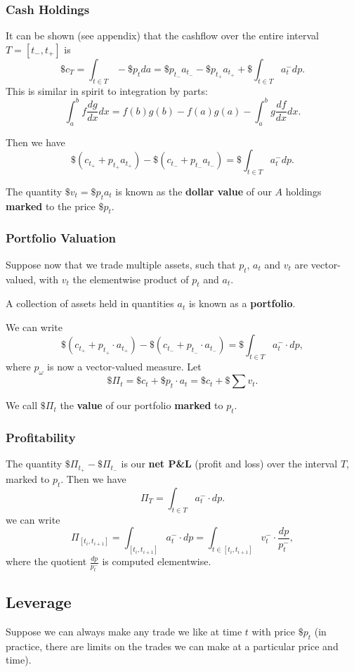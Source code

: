 \documentclass{article}
\begin{document}
\subsubsection{Cash Holdings}
It can be shown (see appendix) that the cashflow over the entire interval $T=[t_-,t_+]$ is
$$\$c_T = \int_{t\in T} - \$p_t da = \$p_{t_-}a_{t_-} - \$p_{t_+}a_{t_+} + \$\int_{t\in T} a_t^- dp.$$
This is similar in spirit to integration by parts:
$$\int_a^b f \frac{dg}{dx} dx = f(b)g(b)-f(a)g(a) - \int_a^b g \frac{df}{dx} dx.$$

Then we have
$$\$(c_{t_+} + p_{t_+}a_{t_+}) - \$(c_{t_-} + p_{t_-}a_{t_-}) = \$\int_{t\in T} a_t^- dp.$$

The quantity $\$v_t = \$p_t a_t$ is known as the \textbf{dollar value} of our $A$ holdings \textbf{marked} to the price $\$p_t$.%

\subsubsection{Portfolio Valuation}
Suppose now that we trade multiple assets, such that $p_t$, $a_t$ and $v_t$ are vector-valued, with $v_t$ the elementwise product of $p_t$ and $a_t$.

A collection of assets held in quantities $a_t$ is known as a \textbf{portfolio}.

We can write
$$\$(c_{t_+} + p_{t_+} \cdot a_{t_+}) - \$(c_{t_-} + p_{t_-} \cdot a_{t_-}) = \$\int_{t\in T} a_t^- \cdot dp,$$
where $p_\omega$ is now a vector-valued measure. Let
$$\$\Pi_t = \$c_t + \$p_t\cdot a_t = \$c_t + \$\sum v_t.$$

We call $\$\Pi_t$ the \textbf{value} of our portfolio \textbf{marked} to $p_t$.

\subsubsection{Profitability}
The quantity $\$\Pi_{t_+} - \$\Pi_{t_-}$ is our \textbf{net P\&L} (profit and loss) over the interval $T$, marked to $p_t$.
Then we have
$$\Pi_T	= \int_{t\in T} a_t^- \cdot dp.$$
we can write
$$\Pi_{[t_i,t_{i+1}]} = \int_{[t_i,t_{i+1}]} a_t^- \cdot dp = \int_{t\in [t_i, t_{i+1}]} v_t^- \cdot \frac{dp}{p_t^-},$$
where the quotient $\frac{dp}{p_t^-}$ is computed elementwise.

\subsection{Leverage}
Suppose we can always make any trade we like at time $t$ with price $\$p_t$ (in practice, there are limits on the trades we can make at a particular price and time). %
\end{document}

